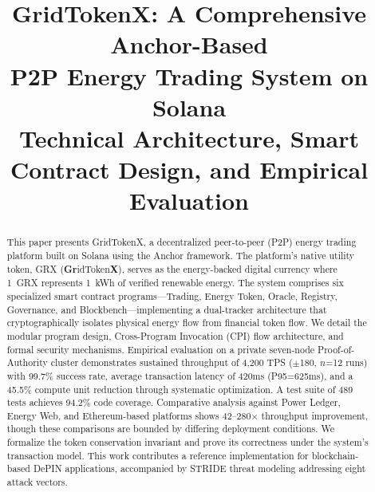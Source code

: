 \documentclass[conference]{IEEEtran}
\begin{document}
\title{GridTokenX: A Comprehensive Anchor-Based\\P2P Energy Trading System on Solana\\
\large Technical Architecture, Smart Contract Design, and Empirical Evaluation}

\author{
}

\maketitle

\begin{abstract}
This paper presents GridTokenX, a decentralized peer-to-peer (P2P) energy trading platform built on Solana using the Anchor framework. The platform's native utility token, GRX (\textbf{Gr}idToken\textbf{X}), serves as the energy-backed digital currency where 1~GRX represents 1~kWh of verified renewable energy. The system comprises six specialized smart contract programs---Trading, Energy Token, Oracle, Registry, Governance, and Blockbench---implementing a dual-tracker architecture that cryptographically isolates physical energy flow from financial token flow. We detail the modular program design, Cross-Program Invocation (CPI) flow architecture, and formal security mechanisms. Empirical evaluation on a private seven-node Proof-of-Authority cluster demonstrates sustained throughput of 4,200 TPS ($\pm$180, $n$=12 runs) with 99.7\% success rate, average transaction latency of 420ms (P95=625ms), and a 45.5\% compute unit reduction through systematic optimization. A test suite of 489 tests achieves 94.2\% code coverage. Comparative analysis against Power Ledger, Energy Web, and Ethereum-based platforms shows 42--280$\times$ throughput improvement, though these comparisons are bounded by differing deployment conditions. We formalize the token conservation invariant and prove its correctness under the system's transaction model. This work contributes a reference implementation for blockchain-based DePIN applications, accompanied by STRIDE threat modeling addressing eight attack vectors.
\end{abstract}
\end{document}
